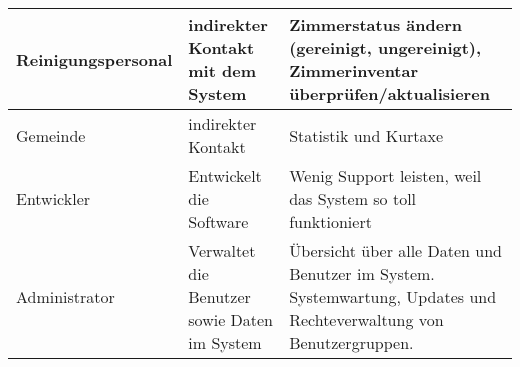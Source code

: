 \begin{longtable}{|p{3.5cm}|p{5cm}|p{6cm}|}
    Reinigungspersonal &
    indirekter Kontakt mit dem System &
    Zimmerstatus ändern (gereinigt, ungereinigt), Zimmerinventar überprüfen/aktualisieren
    \\       \hline

    Gemeinde &
    indirekter Kontakt &
    Statistik und Kurtaxe
    \\       \hline


    Entwickler &
    Entwickelt die Software &
    Wenig Support leisten, weil das System so toll funktioniert
    \\       \hline

    Administrator &
    Verwaltet die Benutzer sowie Daten im System &
    Übersicht über alle Daten und Benutzer im System. Systemwartung, Updates und Rechteverwaltung von Benutzergruppen.
    \\         \hline
\end{longtable}